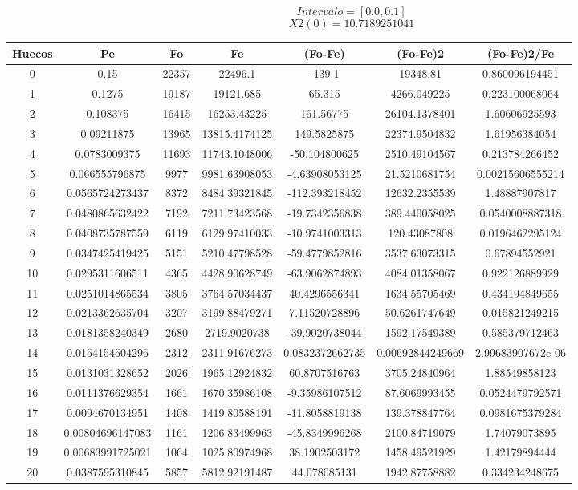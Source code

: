 \documentclass{article}
\begin{document}
$$
Intervalo = [0.0, 0.1]
$$
$$
X2(0) = 10.7189251041
$$
\begin{tabular}{|c|c|c|c|c|c|c|}
Huecos&Pe&Fo&Fe&(Fo{-}Fe)&(Fo{-}Fe)2&(Fo{-}Fe)2/Fe\\
\hline
0&0.15&22357&22496.1&{-}139.1&19348.81&0.860096194451\\
\hline
1&0.1275&19187&19121.685&65.315&4266.049225&0.223100068064\\
\hline
2&0.108375&16415&16253.43225&161.56775&26104.1378401&1.60606925593\\
\hline
3&0.09211875&13965&13815.4174125&149.5825875&22374.9504832&1.61956384054\\
\hline
4&0.0783009375&11693&11743.1048006&{-}50.104800625&2510.49104567&0.213784266452\\
\hline
5&0.066555796875&9977&9981.63908053&{-}4.63908053125&21.5210681754&0.00215606555214\\
\hline
6&0.0565724273437&8372&8484.39321845&{-}112.393218452&12632.2355539&1.48887907817\\
\hline
7&0.0480865632422&7192&7211.73423568&{-}19.7342356838&389.440058025&0.0540008887318\\
\hline
8&0.0408735787559&6119&6129.97410033&{-}10.9741003313&120.43087808&0.0196462295124\\
\hline
9&0.0347425419425&5151&5210.47798528&{-}59.4779852816&3537.63073315&0.67894552921\\
\hline
10&0.0295311606511&4365&4428.90628749&{-}63.9062874893&4084.01358067&0.922126889929\\
\hline
11&0.0251014865534&3805&3764.57034437&40.4296556341&1634.55705469&0.434194849655\\
\hline
12&0.0213362635704&3207&3199.88479271&7.11520728896&50.6261747649&0.015821249215\\
\hline
13&0.0181358240349&2680&2719.9020738&{-}39.9020738044&1592.17549389&0.585379712463\\
\hline
14&0.0154154504296&2312&2311.91676273&0.0832372662735&0.00692844249669&2.99683907672e{-}06\\
\hline
15&0.0131031328652&2026&1965.12924832&60.8707516763&3705.24840964&1.88549858123\\
\hline
16&0.0111376629354&1661&1670.35986108&{-}9.35986107512&87.6069993455&0.0524479792571\\
\hline
17&0.0094670134951&1408&1419.80588191&{-}11.8058819138&139.378847764&0.0981675379284\\
\hline
18&0.00804696147083&1161&1206.83499963&{-}45.8349996268&2100.84719079&1.74079073895\\
\hline
19&0.00683991725021&1064&1025.80974968&38.1902503172&1458.49521929&1.42179894444\\
\hline
20&0.0387595310845&5857&5812.92191487&44.078085131&1942.87758882&0.334234248675\\
\end{tabular}
\end{document}
